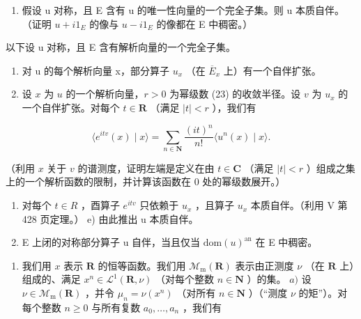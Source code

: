 \begin{enumerate}
\def\labelenumi{\alph{enumi})}
\tightlist
\item
  假设 u 对称，且 E 含有 u 的唯一性向量的一个完全子集。则 u 本质自伴。（证明 \(u + i1_{E}\) 的像与 \(u - i1_{E}\) 的像都在 E 中稠密。）
\end{enumerate}

以下设 u 对称，且 E 含有解析向量的一个完全子集。

\begin{enumerate}
\def\labelenumi{\alph{enumi})}
\setcounter{enumi}{1}
\item
  对 u 的每个解析向量 x，部分算子 \(u_{x}\) （在 \(\overline{E}_{x}\) 上）有一个自伴扩张。
\item
  设 \(x\) 为 \(u\) 的一个解析向量，\(r > 0\) 为幂级数 (23) 的收敛半径。设 \(v\) 为 \(u_x\) 的一个自伴扩张。对每个 \(t \in \mathbf{R}\) （满足 \(|t| < r\) ），我们有
\end{enumerate}

\[
\langle e ^ {i t v} (x) \mid x \rangle = \sum_ {n \in \mathbf {N}} \frac {(i t) ^ {n}}{n !} \langle u ^ {n} (x) \mid x \rangle .
\]

（利用 \(x\) 关于 \(v\) 的谱测度，证明左端是定义在由 \(t \in \mathbf{C}\) （满足 \(|t| < r\) ）组成之集上的一个解析函数的限制，并计算该函数在 0 处的幂级数展开。）

\begin{enumerate}
\def\labelenumi{\alph{enumi})}
\setcounter{enumi}{3}
\item
  对每个 \(t \in R\) ，酉算子 \(e^{itv}\) 只依赖于 \(u_x\) ，且算子 \(u_x\) 本质自伴。（利用 V 第 428 页定理。） e) 由此推出 u 本质自伴。
\item
  E 上闭的对称部分算子 u 自伴，当且仅当 \(\text{dom}(u)^{\text{an}}\) 在 E 中稠密。
\end{enumerate}

\begin{enumerate}
\def\labelenumi{\arabic{enumi})}
\setcounter{enumi}{20}
\tightlist
\item
  我们用 \(x\) 表示 \(\mathbf{R}\) 的恒等函数。我们用 \(\mathcal{M}_{\mathrm{m}}(\mathbf{R})\) 表示由正测度 \(\nu\) （在 \(\mathbf{R}\) 上）组成的、满足 \(x^n \in \mathcal{L}^1(\mathbf{R}, \nu)\) （对每个整数 \(n \in \mathbf{N}\) ）的集。 \(a)\) 设 \(\nu \in \mathcal{M}_{\mathrm{m}}(\mathbf{R})\) ，并令 \(\mu_n = \nu(x^n)\) （对所有 \(n \in \mathbf{N}\) ）（“测度 \(\nu\) 的矩”）。对每个整数 \(n \geqslant 0\) 与所有复数 \(a_0, \ldots, a_n\) ，我们有
\end{enumerate}


